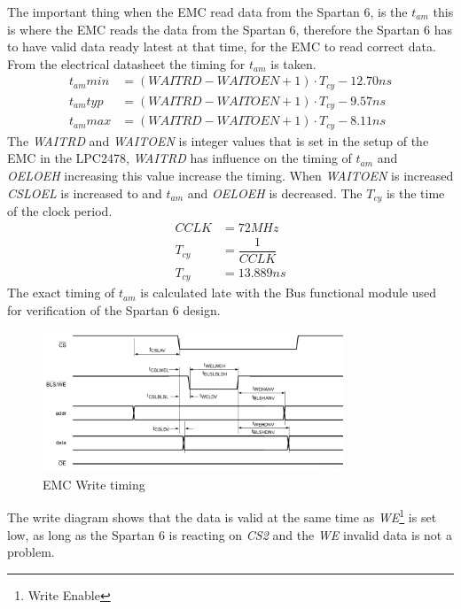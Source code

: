 The important thing when the EMC read data from the Spartan 6, is the $t_{am}$ this is where the EMC reads the data from the Spartan 6, therefore the Spartan 6 has to have valid data ready latest at that time, for the EMC to read correct data. From the electrical datasheet the timing for $t_{am}$ is taken.
\begin{align}
t_{am}min &= (WAITRD - WAITOEN + 1) \cdot T_{cy} - 12.70ns\\
t_{am}typ &= (WAITRD - WAITOEN + 1) \cdot T_{cy} - 9.57ns\\
t_{am}max &= (WAITRD - WAITOEN + 1) \cdot T_{cy} - 8.11ns
\end{align}
The \textit{WAITRD} and \textit{WAITOEN} is integer values that is set in the setup of the EMC in the LPC2478, \textit{WAITRD} has influence on the timing of $t_{am}$ and \textit{OELOEH} increasing this value increase the timing. When \textit{WAITOEN} is increased \textit{CSLOEL} is increased to and $t_{am}$ and \textit{OELOEH} is decreased. The $T_{cy}$ is the time of the clock period.
\begin{align}
CCLK &= 72MHz\\
T_{cy} &= \dfrac{1}{CCLK}\\
T_{cy} &= 13.889ns
\end{align}
The exact timing of $t_{am}$ is calculated late with the Bus functional module used for verification of the Spartan 6 design.
\begin{figure}[H]
	\begin{centering}
		\includegraphics[width=0.8\textwidth]{images/tb7_EMC_write.png}
		\caption{EMC Write timing}
	\end{centering}
\end{figure}
The write diagram shows that the data is valid at the same time as \textit{WE}\footnote{Write Enable} is set low, as long as the Spartan 6 is reacting on \textit{CS2} and the \textit{WE} invalid data is not a problem.
